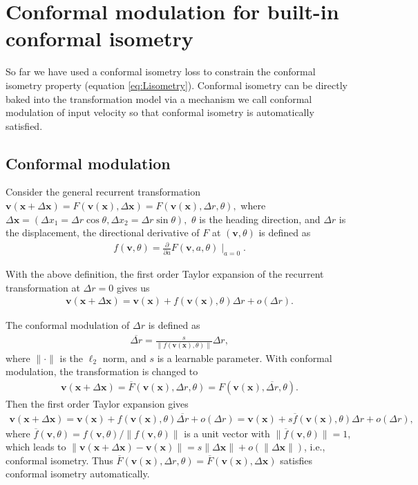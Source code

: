\documentclass{article}
\def\vv{{\bm{v}}}
\def\vx{{\bm{x}}}
\begin{document}
\section{Conformal modulation for built-in conformal isometry}
\label{sec:modulation}

So far we have used a conformal isometry loss to constrain the conformal isometry property (equation \ref{eq:Lisometry}). Conformal isometry can be directly baked into the transformation model via a mechanism we call conformal modulation of input velocity so that conformal isometry is automatically satisfied. 

\subsection{Conformal modulation}
Consider the general recurrent transformation
\(
    \vv(\vx+\Delta \vx) = F(\vv(\vx), \Delta \vx) = F(\vv(\vx), \Delta r, \theta), 
\) 
where 
\(
\Delta \vx = (\Delta x_1 = \Delta r \cos \theta, \Delta x_2 = \Delta r \sin \theta),
\)
 $\theta$ is the heading direction, and $\Delta r$ is the displacement, the {directional derivative} of $F$ at $(\vv, \theta)$ is defined as 
 \begin{eqnarray}
   f(\vv, \theta) = \frac{\partial}{\partial a} F(\vv, a, \theta) \mid_{a = 0}. 
\end{eqnarray}

 With the above definition, the first order Taylor expansion of the recurrent transformation at $\Delta r = 0$ gives us 
\begin{eqnarray}
   \vv(\vx+\Delta \vx) = \vv(\vx) + f(\vv(\vx), \theta) \Delta r + o(\Delta r). \label{eq:ty_trans}
\end{eqnarray}

The {conformal modulation} of $\Delta r$ is defined as 
\begin{eqnarray}
   \overline{\Delta r} = \frac{s}{\|f(\vv(\vx), \theta)\|} \Delta r, \label{eq:CN0}
 \end{eqnarray}
 where $\|\cdot\|$ is the $\ell_2$ norm, and $s$ is a  learnable parameter. With conformal modulation, the transformation is changed to 
\begin{eqnarray}
    \vv(\vx+\Delta \vx) = \overline{F}(\vv(\vx), \Delta r, \theta) =  F(\vv(\vx), \overline{\Delta r}, \theta).  \label{eq:CN1}
\end{eqnarray}
Then the first order Taylor expansion gives 
\begin{eqnarray}
    \vv(\vx+\Delta \vx) =\vv(\vx) + f(\vv(\vx), \theta) \overline{\Delta r} + o(\Delta r)
    = \vv(\vx) + s \overline{f}(\vv(\vx), \theta)  \Delta r + o(\Delta r), 
\end{eqnarray}
where 
$
 \overline{f}(\vv, \theta) = {f(\vv, \theta)}/{\|f(\vv, \theta)\|}
$
is a unit vector with $\|\overline{f}(\vv, \theta)\| = 1$, which leads to $\|\vv(\vx+\Delta \vx) - \vv(\vx)\| = s \|\Delta \vx\| + o(\|\Delta \vx\|)$, i.e., conformal isometry. Thus $\overline{F}(\vv(\vx), \Delta r, \theta) = \overline{F}(\vv(\vx), \Delta \vx)$ satisfies conformal isometry automatically. 
\end{document}
